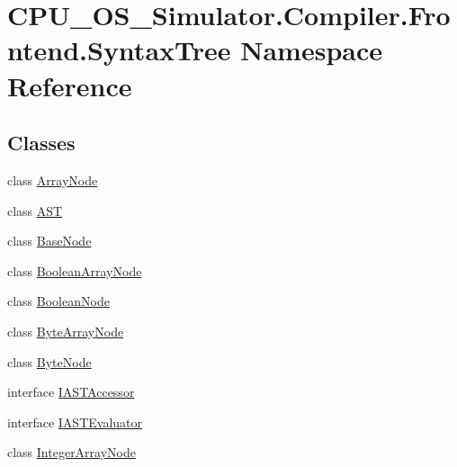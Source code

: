 \hypertarget{namespace_c_p_u___o_s___simulator_1_1_compiler_1_1_frontend_1_1_syntax_tree}{}\section{C\+P\+U\+\_\+\+O\+S\+\_\+\+Simulator.\+Compiler.\+Frontend.\+Syntax\+Tree Namespace Reference}
\label{namespace_c_p_u___o_s___simulator_1_1_compiler_1_1_frontend_1_1_syntax_tree}
\subsection*{Classes}
\begin{DoxyCompactItemize}
\item 
class \hyperlink{class_c_p_u___o_s___simulator_1_1_compiler_1_1_frontend_1_1_syntax_tree_1_1_array_node}{Array\+Node}
\item 
class \hyperlink{class_c_p_u___o_s___simulator_1_1_compiler_1_1_frontend_1_1_syntax_tree_1_1_a_s_t}{A\+S\+T}
\item 
class \hyperlink{class_c_p_u___o_s___simulator_1_1_compiler_1_1_frontend_1_1_syntax_tree_1_1_base_node}{Base\+Node}
\item 
class \hyperlink{class_c_p_u___o_s___simulator_1_1_compiler_1_1_frontend_1_1_syntax_tree_1_1_boolean_array_node}{Boolean\+Array\+Node}
\item 
class \hyperlink{class_c_p_u___o_s___simulator_1_1_compiler_1_1_frontend_1_1_syntax_tree_1_1_boolean_node}{Boolean\+Node}
\item 
class \hyperlink{class_c_p_u___o_s___simulator_1_1_compiler_1_1_frontend_1_1_syntax_tree_1_1_byte_array_node}{Byte\+Array\+Node}
\item 
class \hyperlink{class_c_p_u___o_s___simulator_1_1_compiler_1_1_frontend_1_1_syntax_tree_1_1_byte_node}{Byte\+Node}
\item 
interface \hyperlink{interface_c_p_u___o_s___simulator_1_1_compiler_1_1_frontend_1_1_syntax_tree_1_1_i_a_s_t_accessor}{I\+A\+S\+T\+Accessor}
\item 
interface \hyperlink{interface_c_p_u___o_s___simulator_1_1_compiler_1_1_frontend_1_1_syntax_tree_1_1_i_a_s_t_evaluator}{I\+A\+S\+T\+Evaluator}
\item 
class \hyperlink{class_c_p_u___o_s___simulator_1_1_compiler_1_1_frontend_1_1_syntax_tree_1_1_integer_array_node}{Integer\+Array\+Node}
\item 

\end{DoxyCompactItemize}
